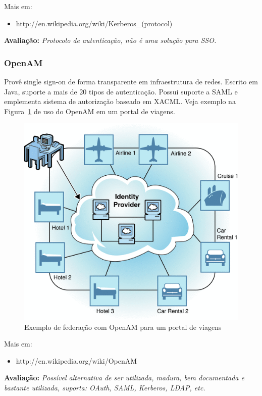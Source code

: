 \documentclass[11pt]{article}
\begin{document}
Mais em:
\begin{itemize}
  \item{http://en.wikipedia.org/wiki/Kerberos\_(protocol)}
\end{itemize}

{\bf Avaliação:} {\it Protocolo de autenticação, não é uma solução para SSO.}

\subsubsection{OpenAM}

Provê single sign-on de forma transparente em infraestrutura de redes. Escrito
em Java, suporte a mais de 20 tipos de autenticação. Possui suporte a SAML e
emplementa sistema de autorização baseado em XACML. Veja exemplo na
Figura~\ref{fig:opensso} de uso do OpenAM em um portal de viagens.

\begin{figure}[h]
\center
\includegraphics[scale=0.5]{opensso.png}
\caption{Exemplo de federação com OpenAM para um portal de viagens}
\label{fig:opensso}
\end{figure}

Mais em:
\begin{itemize}
  \item{http://en.wikipedia.org/wiki/OpenAM}
\end{itemize}

{\bf Avaliação:} {\it Possível alternativa de ser utilizada, madura, bem
documentada e bastante utilizada, suporta: OAuth, SAML, Kerberos, LDAP, etc.}
\end{document}
